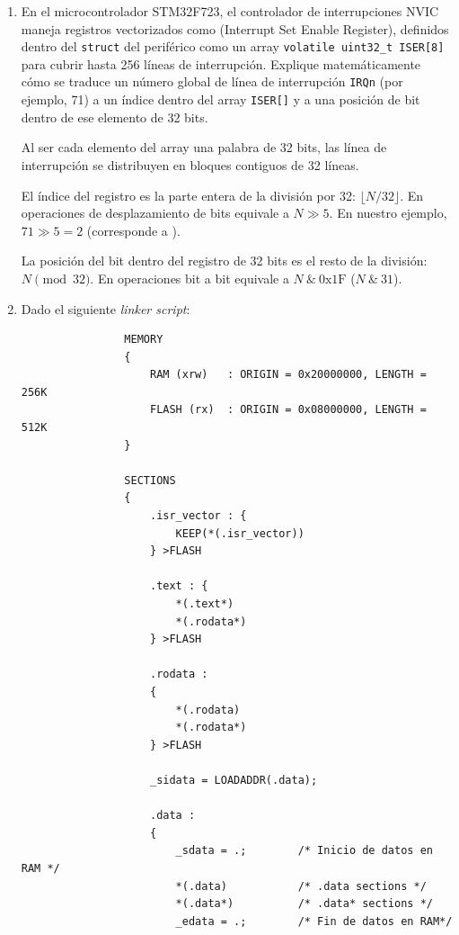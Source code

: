 \documentclass[svgnames,spanish,11pt,a4paper]{article}
\newcounter{solution}
\begin{document}
\begin{enumerate}
        \item En el microcontrolador STM32F723, el controlador de interrupciones NVIC maneja registros vectorizados como  (Interrupt Set Enable Register), definidos dentro del \lstinline|struct| del periférico como un array \lstinline|volatile uint32_t ISER[8]| para cubrir hasta 256 líneas de interrupción. Explique matemáticamente cómo se traduce un número global de línea de interrupción \texttt{IRQn} (por ejemplo, 71) a un índice dentro del array \lstinline|ISER[]| y a una posición de bit dentro de ese elemento de 32 bits.
        
            \begin{solution}
                Al ser cada elemento del array una palabra de 32 bits, las línea de interrupción se distribuyen en bloques contiguos de 32 líneas.
                
                El índice del registro es la parte entera de la división por 32: $\lfloor N / 32 \rfloor$. En operaciones de desplazamiento de bits equivale a $N \gg 5$. En nuestro ejemplo, $71 \gg 5 = 2$ (corresponde a ).

                La posición del bit dentro del registro de 32 bits es el resto de la división: $N \pmod{32}$. En operaciones bit a bit equivale a $N \ \& \ 0\text{x1F}$ ($N \ \& \ 31$).
            \end{solution}


        \item Dado el siguiente \emph{linker script}:
    
            \begin{lstlisting}
                MEMORY
                {
                    RAM (xrw)   : ORIGIN = 0x20000000, LENGTH = 256K
                    FLASH (rx)  : ORIGIN = 0x08000000, LENGTH = 512K
                }

                SECTIONS
                {
                    .isr_vector : {
                        KEEP(*(.isr_vector))
                    } >FLASH

                    .text : {
                        *(.text*)
                        *(.rodata*)
                    } >FLASH

                    .rodata :
                    {
                        *(.rodata)   
                        *(.rodata*)       
                    } >FLASH

                    _sidata = LOADADDR(.data); 

                    .data :
                    {
                        _sdata = .;        /* Inicio de datos en RAM */
                        *(.data)           /* .data sections */
                        *(.data*)          /* .data* sections */
                        _edata = .;        /* Fin de datos en RAM*/


\end{lstlisting}
\end{enumerate}
\end{document}
